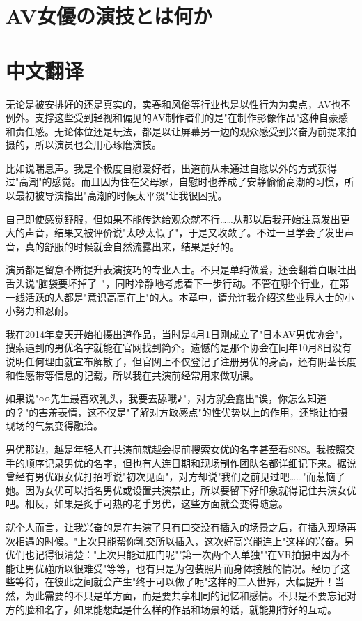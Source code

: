 \documentclass[12pt,UTF8]{ctexbook}
\begin{document}
\switchcolumn

\section{AV女優の演技とは何か}

\switchcolumn

\section*{中文翻译}

无论是被安排好的还是真实的，卖春和风俗等行业也是以性行为为卖点，AV也不例外。支撑这些受到轻视和偏见的AV制作者们的是"在制作影像作品"这种自豪感和责任感。无论体位还是玩法，都是以让屏幕另一边的观众感受到兴奋为前提来拍摄的，所以演员也会用心琢磨演技。

比如说喘息声。我是个极度自慰爱好者，出道前从未通过自慰以外的方式获得过"高潮"的感觉。而且因为住在父母家，自慰时也养成了安静偷偷高潮的习惯，所以最初被导演指出"高潮的时候太平淡"让我很困扰。

自己即使感觉舒服，但如果不能传达给观众就不行……从那以后我开始注意发出更大的声音，结果又被评价说"太吵太假了"，于是又收敛了。不过一旦学会了发出声音，真的舒服的时候就会自然流露出来，结果是好的。

演员都是留意不断提升表演技巧的专业人士。不只是单纯做爱，还会翻着白眼吐出舌头说"脑袋要坏掉了~"，同时冷静地考虑着下一步行动。不管在哪个行业，在第一线活跃的人都是"意识高高在上"的人。本章中，请允许我介绍这些业界人士的小小努力和忍耐。

我在2014年夏天开始拍摄出道作品，当时是4月1日刚成立了"日本AV男优协会"，搜索遇到的男优名字就能在官网找到简介。遗憾的是那个协会在同年10月8日没有说明任何理由就宣布解散了，但官网上不仅登记了注册男优的身高，还有阴茎长度和性感带等信息的记载，所以我在共演前经常用来做功课。

如果说"○○先生最喜欢乳头，我要去舔哦♪"，对方就会露出"诶，你怎么知道的？"的害羞表情，这不仅是"了解对方敏感点"的性优势以上的作用，还能让拍摄现场的气氛变得融洽。

男优那边，越是年轻人在共演前就越会提前搜索女优的名字甚至看SNS。我按照交手的顺序记录男优的名字，但也有人连日期和现场制作团队名都详细记下来。据说曾经有男优跟女优打招呼说"初次见面"，对方却说"我们之前见过吧……"而惹恼了她。因为女优可以指名男优或设置共演禁止，所以要留下好印象就得记住共演女优吧。相反，如果是炙手可热的老手男优，这些方面就会变得随意。

就个人而言，让我兴奋的是在共演了只有口交没有插入的场景之后，在插入现场再次相遇的时候。"上次只能帮你乳交所以插入，这次好高兴能连上"这样的兴奋。男优们也记得很清楚："上次只能进肛门呢""第一次两个人单独""在VR拍摄中因为不能让男优碰所以很难受"等等，也有只是为包装照片而身体接触的情况。经历了这些等待，在彼此之间就会产生"终于可以做了呢"这样的二人世界，大幅提升！当然，为此需要的不只是单方面，而是要共享相同的记忆和感情。不只是不要忘记对方的脸和名字，如果能想起是什么样的作品和场景的话，就能期待好的互动。
\end{document}
